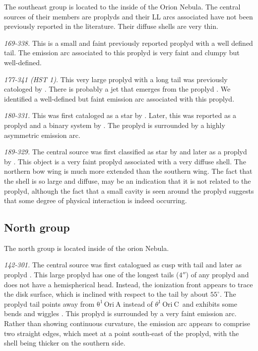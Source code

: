 \documentclass[apj, twocolumn]{aastex63}
\newcommand\thC{\ensuremath{\theta^1\,\mathrm{Ori~C}}}
\renewcommand\clearpage{}
\begin{document}
The southeast group is located to the inside of the Orion Nebula.
The central sources of their members are proplyds and their LL arcs
associated have not been previously reported in the literature.
Their diffuse shells are very thin. 

\textit{169-338.} This is a small and faint previously reported
proplyd \citep{ODell:1994a, Ricci:2008a} with a well defined tail.
The emission arc associated to this proplyd is very faint and clumpy
but well-defined. 

\textit{177-341 (HST 1).} This very large proplyd with a long tail was
previously catologed by \citet{ODell:1994a, Ricci:2008a}. There is
probably a jet that emerges from the proplyd \citep{Bally:2000a}.
We identified a well-defined but faint  emission arc associated with
this proplyd.

\textit{180-331.} This was first cataloged as a star by
\citet{ODell:1996a}. Later, this was reported as a proplyd and a
binary system by \citet{Ricci:2008a}. The proplyd is surrounded by
a highly asymmetric emission arc.

\textit{189-329.}  The central source was first classified as star
by \citet{ODell:1996a} and later as a proplyd by \citet{Ricci:2008a}.
This object is a very faint proplyd associated with a very diffuse
shell. The northern bow wing is much more extended than the southern
wing. The fact that the shell is so large and diffuse, may be an
indication that it is not related to the proplyd, although the fact
that a small cavity is seen  around the proplyd suggests that some
degree of physical interaction is indeed occurring.


\clearpage
\subsection{North group}
\label{sec:n-group}



The north group is located inside of the orion Nebula.

\textit{142-301.} The central source was first catalogued as
cusp with tail \citep{ODell:1996a} and later as proplyd
\citep{Bally:2000a, Ricci:2008a}. This large proplyd has
one of the longest tails (\(4''\)) of any proplyd and does
not have a hemispherical head. Instead, the ionization front
appears to trace the disk surface, which is inclined with
respect to the tail by about $55^{\circ}$. The proplyd tail
points away from \(\mathrm{\theta^1\,Ori~A}\) instead of \thC~and
exhibits some bends and wiggles \citep{Bally:2000a}. This proplyd
is surrounded by a very faint emission arc.  Rather than showing
continuous curvature, the emission arc appears to comprise two
straight edges, which meet at a point south-east of the proplyd,
with the shell being thicker on the southern side.
\end{document}
